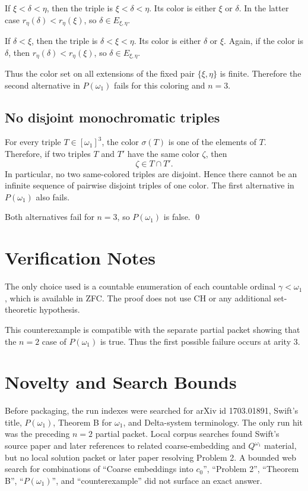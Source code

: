 \documentclass[11pt]{article}
\begin{document}
If \(\xi<\delta<\eta\), then the triple is \(\xi<\delta<\eta\).  Its color is either \(\xi\) or \(\delta\).  In the latter case \(r_\eta(\delta)<r_\eta(\xi)\), so \(\delta\in E_{\xi,\eta}\).

If \(\delta<\xi\), then the triple is \(\delta<\xi<\eta\).  Its color is either \(\delta\) or \(\xi\).  Again, if the color is \(\delta\), then \(r_\eta(\delta)<r_\eta(\xi)\), so \(\delta\in E_{\xi,\eta}\).

Thus the color set on all extensions of the fixed pair \(\{\xi,\eta\}\) is finite.  Therefore the second alternative in \(P(\omega_1)\) fails for this coloring and \(n=3\).

\subsection*{No disjoint monochromatic triples}

For every triple \(T\in[\omega_1]^3\), the color \(\sigma(T)\) is one of the elements of \(T\).  Therefore, if two triples \(T\) and \(T'\) have the same color \(\zeta\), then
\[
  \zeta\in T\cap T'.
\]
In particular, no two same-colored triples are disjoint.  Hence there cannot be an infinite sequence of pairwise disjoint triples of one color.  The first alternative in \(P(\omega_1)\) also fails.

Both alternatives fail for \(n=3\), so \(P(\omega_1)\) is false.
\qed

\section*{Verification Notes}

The only choice used is a countable enumeration of each countable ordinal \(\gamma<\omega_1\), which is available in ZFC.  The proof does not use CH or any additional set-theoretic hypothesis.

This counterexample is compatible with the separate partial packet showing that the \(n=2\) case of \(P(\omega_1)\) is true.  Thus the first possible failure occurs at arity \(3\).

\section*{Novelty and Search Bounds}

Before packaging, the run indexes were searched for arXiv id 1703.01891, Swift's title, \(P(\omega_1)\), Theorem B for \(\omega_1\), and Delta-system terminology.  The only run hit was the preceding \(n=2\) partial packet.  Local corpus searches found Swift's source paper and later references to related coarse-embedding and \(Q^{\omega_1}\) material, but no local solution packet or later paper resolving Problem 2.  A bounded web search for combinations of ``Coarse embeddings into \(c_0\)'', ``Problem 2'', ``Theorem B'', ``\(P(\omega_1)\)'', and ``counterexample'' did not surface an exact answer.
\end{document}
